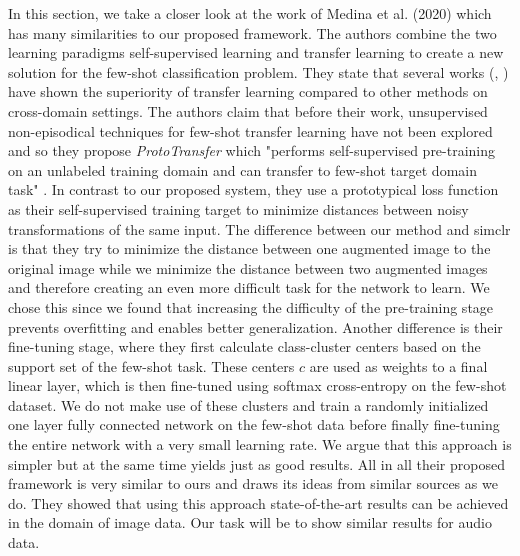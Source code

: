 In this section, we take a closer look at the work of Medina et al. (2020) \cite{medina2020selfsupervised} which has many similarities to our proposed framework. The authors combine the two learning paradigms self-supervised learning and transfer learning to create a new solution for the few-shot classification problem. They state that several works (\cite{chen2020selfsupervised}, \cite{guo2020broader}) have shown the superiority of transfer learning compared to other methods on cross-domain settings. The authors claim that before their work, unsupervised non-episodical techniques for few-shot transfer learning have not been explored and so they propose \textit{ProtoTransfer} which "performs self-supervised pre-training on an unlabeled training domain and can transfer to few-shot target domain task" \cite{medina2020selfsupervised}. In contrast to our proposed system, they use a prototypical loss function as their self-supervised training target to minimize distances between noisy transformations of the same input. The difference between our method and \gls{simclr} is that they try to minimize the distance between one augmented image to the original image while we minimize the distance between two augmented images and therefore creating an even more difficult task for the network to learn. We chose this since we found that increasing the difficulty of the pre-training stage prevents overfitting and enables better generalization. Another difference is their fine-tuning stage, where they first calculate class-cluster centers based on the support set of the few-shot task. These centers $c$ are used as weights to a final linear layer, which is then fine-tuned using softmax cross-entropy on the few-shot dataset. We do not make use of these clusters and train a randomly initialized one layer fully connected network on the few-shot data before finally fine-tuning the entire network with a very small learning rate. We argue that this approach is simpler but at the same time yields just as good results. All in all their proposed framework is very similar to ours and draws its ideas from similar sources as we do. They showed that using this approach state-of-the-art results can be achieved in the domain of image data. Our task will be to show similar results for audio data.